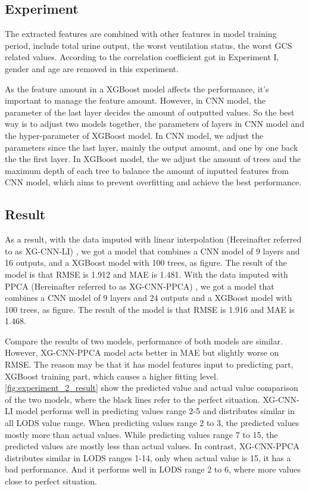\documentclass[12pt,a4paper,english
]{tunithesis}
\begin{document}
\subsection{Experiment}
The extracted features are combined with other features in model training period, include total urine output, the worst ventilation status, the worst GCS related values. According to the correlation coefficient got in Experiment I, gender and age are removed in this experiment. 

As the feature amount in a XGBoost model affects the performance, it's important to manage the feature amount. However, in CNN model, the parameter of the last layer decides the amount of outputted values. So the best way is to adjust two models together, the parameters of layers in CNN model and the hyper-parameter of XGBoost model. In CNN model, we adjust the parameters since the last layer, mainly the output amount, and one by one back the the first layer. In XGBoost model, the we adjust the amount of trees and the maximum depth of each tree to balance the amount of inputted features from CNN model, which aims to prevent overfitting and achieve the best performance.

\subsection{Result}
As a result, with the data imputed with linear interpolation (Hereinafter referred to as XG-CNN-LI) , we got a model that combines a CNN model of 9 layers and 16 outputs, and a XGBoost model with 100 trees, as figure. The result of the model is that RMSE is 1.912 and MAE is 1.481. With the data imputed with PPCA (Hereinafter referred to as XG-CNN-PPCA) , we got a model that combines a CNN model of 9 layers and 24 outputs and a XGBoost model with 100 trees, as figure. The result of the model is that RMSE is 1.916 and MAE is 1.468.

Compare the results of two models, performance of both models are similar. However, XG-CNN-PPCA model acts better in MAE but slightly worse on RMSE. The reason may be that it has model features input to predicting part, XGBoost training part, which causes a higher fitting level. \ref{fig:experiment_2_result} show the predicted value and actual value comparison of the two models, where the black lines refer to the perfect situation. XG-CNN-LI model performs well in predicting values range 2-5 and distributes similar in all LODS value range. When predicting values range 2 to 3, the predicted values mostly more than actual values. While predicting values range 7 to 15, the predicted values are mostly less than actual values. In contrast, XG-CNN-PPCA distributes similar in LODS ranges 1-14, only when actual value is 15, it has a bad performance. And it performs well in LODS range 2 to 6, where more values close to perfect situation.
\end{document}
